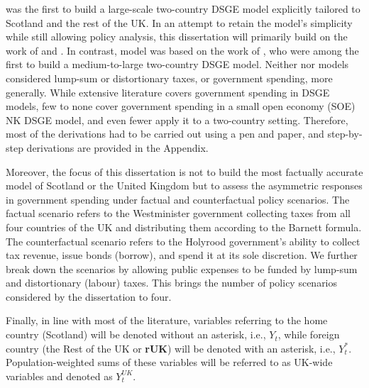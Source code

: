 \textcite{ricci_2019_essays} was the first to build a large-scale two-country DSGE model explicitly tailored to Scotland and the rest of the UK. In an attempt to retain the model's simplicity while still allowing policy analysis, this dissertation will primarily build on the work of \textcite{gali_2005_monetary} and \textcite{jordigal_2015_monetary}. In contrast, \textcite{ricci_2019_essays} model was based on the work of \textcite{rabanal_2010_eurodollar}, who were among the first to build a medium-to-large two-country DSGE model. Neither \textcite{gali_2005_monetary} nor \textcite{jordigal_2015_monetary} models considered lump-sum or distortionary taxes, or government spending, more generally. While extensive literature covers government spending in DSGE models, few to none cover government spending in a small open economy (SOE) NK DSGE model, and even fewer apply it to a two-country setting. Therefore, most of the derivations had to be carried out using a pen and paper, and step-by-step derivations are provided in the Appendix.

Moreover, the focus of this dissertation is not to build the most factually accurate model of Scotland or the United Kingdom but to assess the asymmetric responses in government spending under factual and counterfactual policy scenarios. The factual scenario refers to the Westminister government collecting taxes from all four countries of the UK and distributing them according to the Barnett formula. The counterfactual scenario refers to the Holyrood government's ability to collect tax revenue, issue bonds (borrow), and spend it at its sole discretion. We further break down the scenarios by allowing public expenses to be funded by lump-sum and distortionary (labour) taxes. This brings the number of policy scenarios considered by the dissertation to four.

Finally, in line with most of the literature, variables referring to the home country (Scotland) will be denoted without an asterisk, i.e., $Y_t$, while foreign country (the Rest of the UK or \textbf{rUK}) will be denoted with an asterisk, i.e., $Y^*_t$. Population-weighted sums of these variables will be referred to as UK-wide variables and denoted as $Y_t^{UK}$.